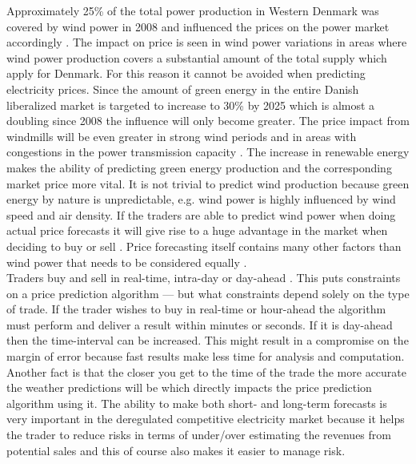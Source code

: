 Approximately 25\% of the total power production in Western Denmark was covered by wind power in 2008 and influenced the prices on the power market accordingly \cite{windPowerDanishLiberalized}. The impact on price is seen in wind power variations in areas where wind power production covers a substantial amount of the total supply which apply for Denmark. For this reason it cannot be avoided when predicting electricity prices\cite{dayAheadImpactOfWindPowerForecasts}. Since the amount of green energy in the entire Danish liberalized market is targeted to increase to 30\% by 2025 which is almost a doubling since 2008 \cite{windPowerDanishLiberalized} the influence will only become greater. The price impact from windmills will be even greater in strong wind periods and in areas with congestions in the power transmission capacity \cite{windPowerDanishLiberalized}. The increase in renewable energy makes the ability of predicting green energy production and the corresponding market price more vital. It is not trivial to predict wind production because green energy by nature is unpredictable, e.g. wind power is highly influenced by wind speed and air density. If the traders are able to predict wind power when doing actual price forecasts it will give rise to a huge advantage in the market when deciding to buy or sell \cite{dayAheadImpactOfWindPowerForecasts}. Price forecasting itself contains many other factors than wind power that needs to be considered equally \cite{21}.
\\[0.5cm] Traders buy and sell in real-time, intra-day or day-ahead \cite{FIND REF}. This puts constraints on a price prediction algorithm --- but what constraints depend solely on the type of trade. If the trader wishes to buy in real-time or hour-ahead the algorithm must perform and deliver a result within minutes or seconds. If it is day-ahead then the time-interval can be increased. This might result in a compromise on the margin of error because fast results make less time for analysis and computation. Another fact is that the closer you get to the time of the trade the more accurate the weather predictions will be which directly impacts the price prediction algorithm using it. The ability to make both short- and long-term forecasts is very important in the deregulated competitive electricity market because it helps the trader to reduce risks in terms of under/over estimating the revenues from potential sales and this of course also makes it easier to manage risk\cite{21}.
\\[0.5cm]
